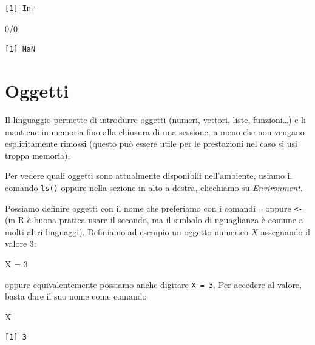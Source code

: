 \documentclass[
  italian,
  letterpaper,
]{book}
\newenvironment{Shaded}{\begin{snugshade}}{\end{snugshade}}
\newcommand{\DecValTok}[1]{\textcolor[rgb]{0.68,0.00,0.00}{#1}}
\newcommand{\NormalTok}[1]{\textcolor[rgb]{0.00,0.23,0.31}{#1}}
\newcommand{\OtherTok}[1]{\textcolor[rgb]{0.00,0.23,0.31}{#1}}
\newcommand{\SpecialCharTok}[1]{\textcolor[rgb]{0.37,0.37,0.37}{#1}}
\theoremstyle{definition}
\theoremstyle{remark}
\begin{document}
\begin{verbatim}
[1] Inf
\end{verbatim}

\begin{Shaded}
\begin{Highlighting}[]
\DecValTok{0}\SpecialCharTok{/}\DecValTok{0}
\end{Highlighting}
\end{Shaded}

\begin{verbatim}
[1] NaN
\end{verbatim}

\section{Oggetti}\label{oggetti}

Il linguaggio permette di introdurre oggetti (numeri, vettori, liste,
funzioni\ldots) e li mantiene in memoria fino alla chiusura di una
sessione, a meno che non vengano esplicitamente rimossi (questo può
essere utile per le prestazioni nel caso si usi troppa memoria).

Per vedere quali oggetti sono attualmente disponibili nell'ambiente,
usiamo il comando \texttt{ls()} oppure nella sezione in alto a destra,
clicchiamo su \emph{Environment}.

Possiamo definire oggetti con il nome che preferiamo con i comandi
\texttt{=} oppure \texttt{\textless{}-} (in R è buona pratica usare il
secondo, ma il simbolo di uguaglianza è comune a molti altri linguaggi).
Definiamo ad esempio un oggetto numerico \(X\) assegnando il valore 3:

\begin{Shaded}
\begin{Highlighting}[]
\NormalTok{X }\OtherTok{=} \DecValTok{3}
\end{Highlighting}
\end{Shaded}

oppure equivalentemente possiamo anche digitare \texttt{X\ =\ 3}. Per
accedere al valore, basta dare il suo nome come comando

\begin{Shaded}
\begin{Highlighting}[]
\NormalTok{X}
\end{Highlighting}
\end{Shaded}

\begin{verbatim}
[1] 3
\end{verbatim}
\end{document}
